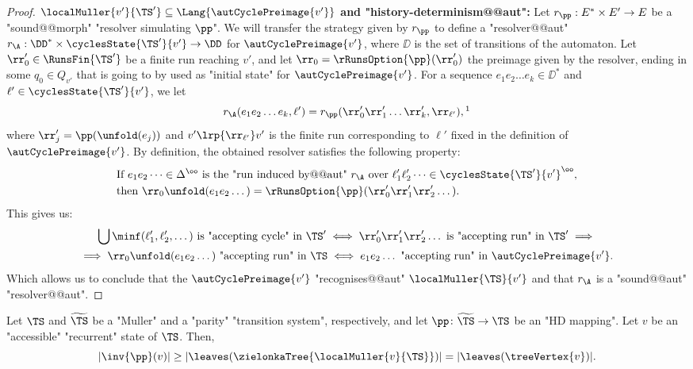 \documentclass{theoretics}
\begin{document}
\begin{proof}
	
\textbf{$\localMuller{v'}{\TS'}\subseteq \Lang{\autCyclePreimage{v'}}$ and "history-determinism@@aut":} 	
 Let $r_\pp:E^*\times E' \to E$ be a "sound@@morph" "resolver simulating $\pp$". We will transfer the strategy given by $r_\pp$ to define a "resolver@@aut" $r_\A:\DD^*\times \cyclesState{\TS'}{v'} \to \DD$ for $\autCyclePreimage{v'}$, where $\DD$ is the set of transitions of the automaton.  
 Let $\rr_0'\in \RunsFin{\TS'}$ be a finite run reaching $v'$, and let $\rr_0 = \rRunsOption{\pp}(\rr_0')$ the preimage given by the resolver, ending in some $q_0\in Q_{v'}$ that is going to by used as "initial state" for $\autCyclePreimage{v'}$. For a sequence $e_1e_2\dots e_k\in \DD^*$ and $\ell'\in \cyclesState{\TS'}{v'}$, we let
 \[ r_\A(e_1e_2\dots e_k, \ell') = r_\pp(\rr_0'\rr_1'\dots \rr_k', \rr_{\ell'}),\footnotemark{} \]
 where $\rr_j' = \pp(\unfold(e_j))$ and $v'\lrp{\rr_{\ell'}}v'$ is the finite run corresponding to $\ell'$ fixed in the definition of $\autCyclePreimage{v'}$.
 By definition, the obtained resolver satisfies the following property: 
 \begin{align}
 	\nonumber&\text{If } e_1e_2\dots \in \Delta^\oo \text{ is the "run induced by@@aut" } r_\A  \text{ over } \ell_1'\ell_2'\dots \in \cyclesState{\TS'}{v'}^\oo,\\
 	\nonumber&\text{then } \rr_0\unfold(e_1e_2\dots) = \rRunsOption{\pp}(\rr_0'\rr_1'\rr_2'\dots).
 \end{align}
 This gives us:
 \begin{multline}
 	\nonumber \bigcup\minf(\ell_1',\ell_2',\dots) \text{ is "accepting cycle" in } \TS' \iff \rr_0'\rr_1'\rr_2'\dots \text{ is "accepting run" in } \TS' \implies \\
 	\implies \rr_0\unfold(e_1e_2\dots) \text{ "accepting run" in }  \TS  \iff e_1e_2\dots \text{ "accepting run" in }  \autCyclePreimage{v'}. 
 \end{multline}
 Which allows us to conclude that the $\autCyclePreimage{v'}$ "recognises@@aut" $\localMuller{\TS}{v'}$ and that $r_\A$ is a "sound@@aut" "resolver@@aut".  
\end{proof}

\begin{corollary}
	Let $\TS$ and $\widetilde{\TS}$ be a "Muller" and a "parity" "transition system", respectively, and let $\pp \colon \widetilde{\TS} \to \TS$ be an "HD mapping". Let $v$ be an "accessible" "recurrent" state of $\TS$. Then,
	\[ |\inv{\pp}(v)| \geq |\leaves(\zielonkaTree{\localMuller{v}{\TS}})| = |\leaves(\treeVertex{v})|.\]
\end{corollary}
\end{document}
